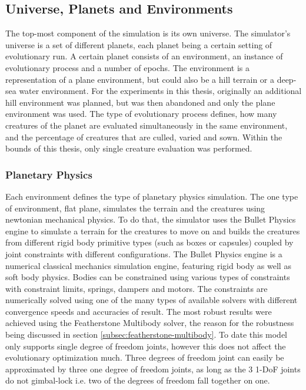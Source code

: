 \documentclass[main]{subfiles}
\begin{document}
\subsection{Universe, Planets and Environments}

The top-most component of the simulation is its own universe. %
%
The simulator's universe is a set of different planets, each planet being a certain setting of evolutionary run. %
%
A certain planet consists of an environment, an instance of evolutionary process and a number of epochs. %
%
The environment is a representation of a plane environment, but could also be a hill terrain or a deep-sea water environment. %
%
For the experiments in this thesis, originally an additional hill environment was planned, but was then abandoned and only the plane environment was used. %
%
The type of evolutionary process defines, how many creatures of the planet are evaluated simultaneously in the same environment, and the percentage of creatures that are culled, varied and sown. %
%
Within the bounds of this thesis, only single creature evaluation was performed. 

\subsubsection{Planetary Physics}

Each environment defines the type of planetary physics simulation. %
%
The one type of environment, flat plane, simulates the terrain and the creatures using newtonian mechanical physics. %
%
To do that, the simulator uses the Bullet Physics engine\cite{bib:BulletPhysics2015} to simulate a terrain for the creatures to move on and builds the creatures from different rigid body primitive types (such as boxes or capsules) coupled by joint constraints with different configurations. %
%
The Bullet Physics engine is a numerical classical mechanics simulation engine, featuring rigid body as well as soft body physics. %
%
Bodies can be constrained using various types of constraints with constraint limits, springs, dampers and motors. %
%
The constraints are numerically solved using one of the many types of available solvers with different convergence speeds and accuracies of result. %
%
The most robust results were achieved using the Featherstone Multibody solver, the reason for the robustness being discussed in section \ref{subsec:featherstone-multibody}. %
%
To date this model only supports single degree of freedom joints, however this does not affect the evolutionary optimization much. %
%
Three degrees of freedom joint can easily be approximated by three one degree of freedom joints, as long as the 3 1-DoF joints do not gimbal-lock i.e. two of the degrees of freedom fall together on one.
\end{document}
